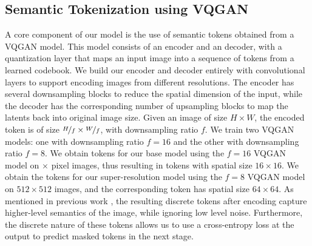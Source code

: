 \subsection{Semantic Tokenization using VQGAN}
\label{sec:vqgan}
A core component of our model is the use of semantic tokens obtained from a VQGAN \cite{esser2021taming} model. This model consists of an encoder and an decoder, with a quantization layer that maps an input image into a sequence of tokens from a learned codebook. We build our encoder and decoder entirely with convolutional layers to support encoding images from different resolutions. The encoder has several downsampling blocks to reduce the spatial dimension of the input, while the decoder has the corresponding number of upsampling blocks to map the latents back into original image size. Given an image of size $H \times W$, the encoded token is of size $\nicefrac{H}{f} \times \nicefrac{W}{f}$, with downsampling ratio $f$.
We train two VQGAN models: one with downsampling ratio $f=16$ and the other with downsampling ratio $f=8$. We obtain tokens for our base model using the $f=16$ VQGAN model on {\lowres}$\times${\lowres} pixel images, thus resulting in tokens with spatial size $16 \times 16$. We obtain the tokens for our super-resolution model using the $f=8$ VQGAN model on $512\times512$ images, and the corresponding token has spatial size $64\times64$. As mentioned in previous work \citep{esser2021taming}, the resulting discrete tokens after encoding capture higher-level semantics of the image, while ignoring low level noise. Furthermore, the discrete nature of these tokens allows us to use a cross-entropy loss at the output to predict masked tokens in the next stage.


